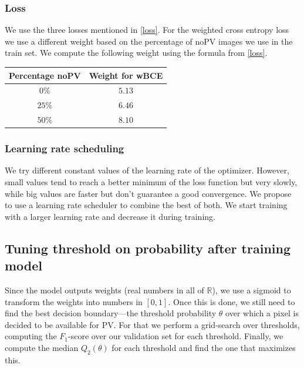 \documentclass[10pt,conference]{IEEEtran}
\begin{document}
\subsubsection{Loss}
We use the three losses mentioned in \autoref{loss}. For the weighted cross entropy loss we use a different weight based on the percentage of noPV images we use in the train set. We compute the following weight using the formula from \autoref{loss}.
\begin{center}
    \begin{tabular}{||c | c||} 
        \hline
        Percentage noPV & Weight for wBCE\\ [0.5ex] 
        \hline\hline
        $0\%$ & $5.13$ \\
        \hline
        $25\%$ & $6.46$ \\
        \hline
        $50\%$ & $8.10$ \\
        \hline
    \end{tabular}
\end{center}

\subsubsection{Learning rate scheduling}
We try different constant values of the learning rate of the optimizer. However, small values tend to reach a better minimum of the loss function but very slowly, while big values are faster but don't guarantee a good convergence. We propose to use a learning rate scheduler to combine the best of both. We start training with a larger learning rate and decrease it during training.

\subsection{Tuning threshold on probability after training model}
Since the model outputs weights (real numbers in all of $\mathbb{R}$),
we use a sigmoid to transform the weights into numbers in $[0,1]$.
Once this is done, we still need to find the best decision boundary---the threshold probability $\theta$ over which a pixel is decided to be available for PV.
For that we perform a grid-search over thresholds, computing the $F_1$-score over our validation set
for each threshold.
Finally, we compute the median $Q_2(\theta)$ for each threshold and find the one that maximizes this.
\end{document}
